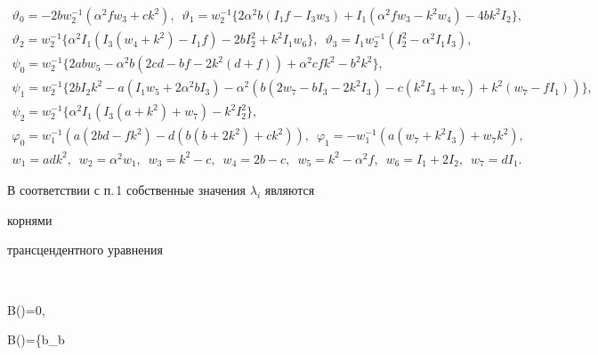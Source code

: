 \begin{exam}
\begin{gather*} 


\vartheta_0=-2b w^{-1}_2(\alpha^2f w_3+c k^2),


\ \; \vartheta_1=w^{-1}_2\{2\alpha^2b(I_1f-I_3w_3)+ 


I_1(\alpha^2f w_3-k^2w_4)-4b k^2I_2\},\\ 


% 


\vartheta_2=w^{-1}_2\{\alpha^2I_1(I_3(w_4+k^2)- 


I_1f)-2b I^2_2+k^2I_1w_6\},


\ \; \vartheta_3=I_1w^{-1}_2(I^2_2-\alpha^2I_1I_3),\\ 


% 


\psi_0=w^{-1}_2\{2a b w_5-\alpha^2b(2c d-b f-2k^2(d+f))+ 


\alpha^2c f k^2-b^2k^2\},\\ 


% 


\psi_1=w^{-1}_2\{2b I_2k^2-a(I_1w_5+2\alpha^2b I_3)- 


\alpha^2(b(2w_7-b I_3-2k^2I_3)-c(k^2I_3+w_7)+ 


k^2(w_7-f I_1))\}, \\ 


% 


\psi_2=w^{-1}_2\{\alpha^2I_1(I_3(a+k^2)+w_7)-k^2I^2_2\},\\ 


% 


\varphi_0=w^{-1}_1(a(2b d-f k^2)-d(b(b+2k^2)+c k^2)), 


\ \; \varphi_1=-w^{-1}_1(a(w_7+k^2I_3)+w_7k^2),\\ 


% 


w_1=a d k^2,\ \; w_2=\alpha^2w_1,\ \; w_3=k^2-c, 


\ \; w_4=2b-c,\ \; w_5=k^2-\alpha^2f, 


\ \; w_6=I_1+2I_2,\ \; w_7=d I_1. 


\end{gather*} 


В соответствии с п.\,1 собственные значения $\lambda_i$ являются 


корнями 


трансцендентного уравнения 


$$ 


\det\bold B(\lambda)=0,\quad 


\bold B(\lambda)=\bigg\{\bold b_b\frac{\partial}{\partial\theta}



\end{exam}
